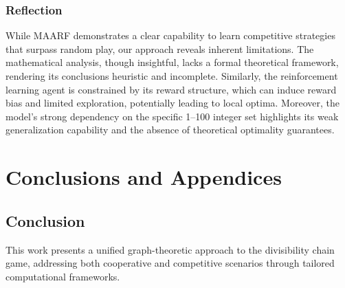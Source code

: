 \documentclass[twocolumn, a4paper]{article}
\begin{document}
\subsubsection{Reflection}
While MAARF demonstrates a clear capability to learn competitive strategies that surpass random play, our approach reveals inherent limitations. The mathematical analysis, though insightful, lacks a formal theoretical framework, rendering its conclusions heuristic and incomplete. Similarly, the reinforcement learning agent is constrained by its reward structure, which can induce reward bias and limited exploration, potentially leading to local optima. Moreover, the model's strong dependency on the specific 1--100 integer set highlights its weak generalization capability and the absence of theoretical optimality guarantees.

\section{Conclusions and Appendices}
\subsection{Conclusion}
This work presents a unified graph-theoretic approach to the divisibility chain game, addressing both cooperative and competitive scenarios through tailored computational frameworks.
\end{document}
